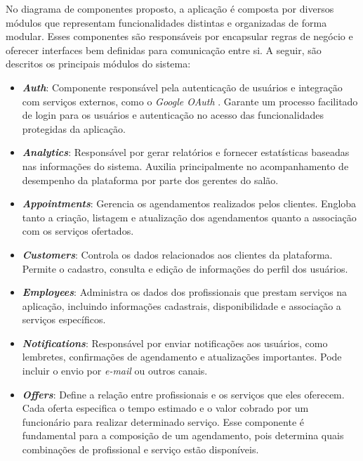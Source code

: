 No diagrama de componentes proposto, a aplicação é composta por diversos módulos que representam funcionalidades distintas e organizadas de forma modular. Esses componentes são responsáveis por encapsular regras de negócio e oferecer interfaces bem definidas para comunicação entre si. A seguir, são descritos os principais módulos do sistema:

\begin{itemize}
  \item \textbf{\emph{Auth}}: Componente responsável pela autenticação de usuários e integração com serviços externos, como o \emph{Google OAuth} \cite{GoogleOAuth}. Garante um processo facilitado de login para os usuários e autenticação no acesso das funcionalidades protegidas da aplicação.

  \item \textbf{\emph{Analytics}}: Responsável por gerar relatórios e fornecer estatísticas baseadas nas informações do sistema. Auxilia principalmente no acompanhamento de desempenho da plataforma por parte dos gerentes do salão.

  \item \textbf{\emph{Appointments}}: Gerencia os agendamentos realizados pelos clientes. Engloba tanto a criação, listagem e atualização dos agendamentos quanto a associação com os serviços ofertados.

  \item \textbf{\emph{Customers}}: Controla os dados relacionados aos clientes da plataforma. Permite o cadastro, consulta e edição de informações do perfil dos usuários.

  \item \textbf{\emph{Employees}}: Administra os dados dos profissionais que prestam serviços na aplicação, incluindo informações cadastrais, disponibilidade e associação a serviços específicos.

  \item \textbf{\emph{Notifications}}: Responsável por enviar notificações aos usuários, como lembretes, confirmações de agendamento e atualizações importantes. Pode incluir o envio por \emph{e-mail} ou outros canais.

  \item \textbf{\emph{Offers}}: Define a relação entre profissionais e os serviços que eles oferecem. Cada oferta especifica o tempo estimado e o valor cobrado por um funcionário para realizar determinado serviço. Esse componente é fundamental para a composição de um agendamento, pois determina quais combinações de profissional e serviço estão disponíveis.


\end{itemize}
